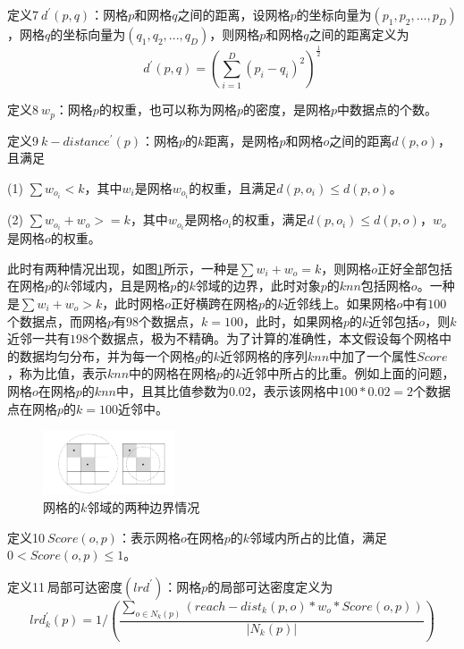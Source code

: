 定义7$\ d^{'}\left ( p,q \right )$：网格$p$和网格$q$之间的距离，设网格$p$的坐标向量为$(p_1, p_2, ..., p_D)$，网格$q$的坐标向量为$(q_1, q_2, ..., q_D)$，则网格$p$和网格$q$之间的距离定义为
\begin{equation}
d^{'}(p,q) = (\sum_{i=1}^{D}(p_i - q_i)^{2})^{\frac{1}{2}}
\end{equation}

定义8$\ w_p$：网格$p$的权重，也可以称为网格$p$的密度，是网格$p$中数据点的个数。

定义9$\ k-distance^{'}(p)$：网格$p$的$k$距离，是网格$p$和网格$o$之间的距离$d(p, o)$，且满足

(1) $\sum  w_{o_i} < k $，其中$w_i$是网格$ w_{o_i}$的权重，且满足$d(p,o_i)\leq d(p,o)$。

(2) $\sum  w_{o_i} + w_o >= k$，其中$ w_{o_i}$是网格$o_i$的权重，满足$d(p,o_i)\leq d(p,o)$，$w_o$是网格$o$的权重。

此时有两种情况出现，如图\ref{fig:fig35}所示，一种是$\sum w_i + w_o = k$，则网格$o$正好全部包括在网格$p$的$k$邻域内，且是网格$p$的$k$邻域的边界，此时对象$p$的$knn$包括网格$o$。一种是$\sum w_i + w_o > k$，此时网格$o$正好横跨在网格$p$的$k$近邻线上。如果网格$o$中有$100$个数据点，而网格$p$有$98$个数据点，$k=100$，此时，如果网格$p$的$k$近邻包括$o$，则$k$近邻一共有$198$个数据点，极为不精确。为了计算的准确性，本文假设每个网格中的数据均匀分布，并为每一个网格$g$的$k$近邻网格的序列$knn$中加了一个属性$Score$，称为比值，表示$knn$中的网格在网格$p$的$k$近邻中所占的比重。例如上面的问题，网格$o$在网格$p$的$knn$中，且其比值参数为$0.02$，表示该网格中$100 * 0.02 = 2$个数据点在网格$p$的$k=100$近邻中。

\begin{figure}[htb]
	\centering
	\includegraphics[width=0.35\textwidth]{figures/figure3x5}
	\caption{网格的$k$邻域的两种边界情况}\label{fig:fig35}
\end{figure}

定义10$\ Score(o, p)$：表示网格$o$在网格$p$的$k$邻域内所占的比值，满足$0 < Score(o, p) \leq 1$。

定义11$\ $局部可达密度$\left ( lrd^{'} \right )$：网格$p$的局部可达密度定义为
\begin{equation}
lrd_{k}^{'}(p) = 1 / \left ( \frac{\sum_{o\in N_k(p)}(reach-dist_k(p,o)*w_o*Score(o,p))}{\left | N_k(p) \right | } \right )
\end{equation}

